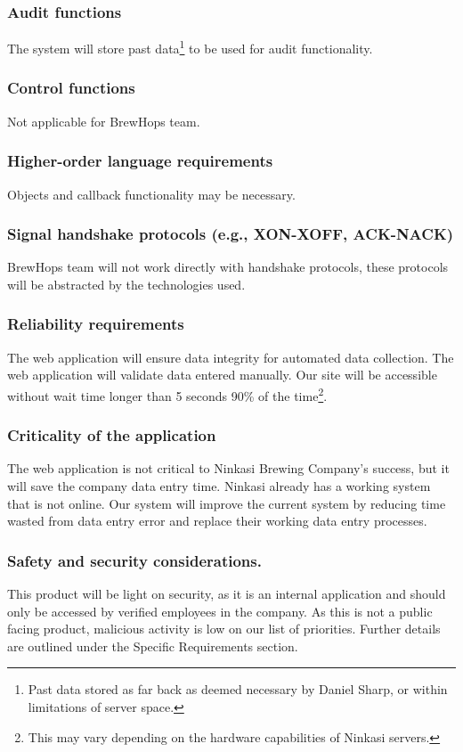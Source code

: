 \documentclass[draftclsnofoot,onecolumn,letterpaper,10pt,compsoc]{IEEEtran}
\begin{document}
		\subsubsection{Audit functions}
        The system will store past data\footnote{Past data stored as far back as deemed necessary by Daniel Sharp, or within limitations of server space.} to be used for audit functionality.

		\subsubsection{Control functions}
        Not applicable for BrewHops team.

		\subsubsection{Higher-order language requirements}
        Objects and callback functionality may be necessary.

		\subsubsection{Signal handshake protocols (e.g., XON-XOFF, ACK-NACK)}
        BrewHops team will not work directly with handshake protocols, these protocols will be abstracted by the technologies used.

		\subsubsection{Reliability requirements}
		The web application will ensure data integrity for automated data collection.
		The web application will validate data entered manually.
		Our site will be accessible without wait time longer than 5 seconds 90\% of the time\footnote{This may vary depending on the hardware capabilities of Ninkasi servers.}.

		\subsubsection{Criticality of the application}
		The web application is not critical to Ninkasi Brewing Company’s success, but it will save the company data entry time.
		Ninkasi already has a working system that is not online.
		Our system will improve the current system by reducing time wasted from data entry error and replace their working data entry processes.

		\subsubsection{Safety and security considerations.}
		This product will be light on security, as it is an internal application and should only be accessed by verified employees in the company.
		As this is not a public facing product, malicious activity is low on our list of priorities.
		Further details are outlined under the Specific Requirements section.
\end{document}

